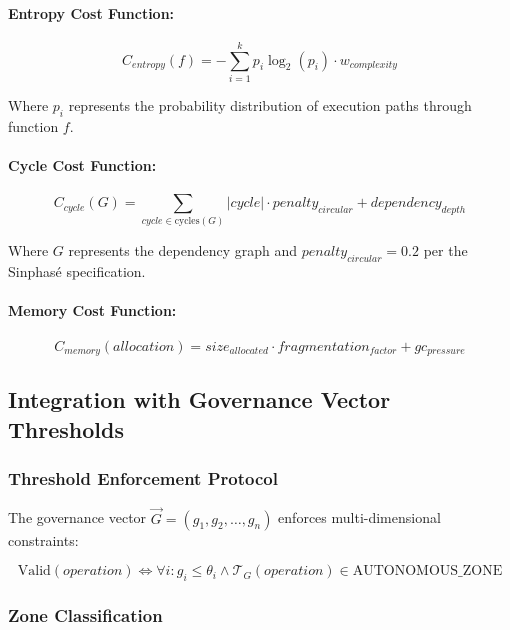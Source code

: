 \paragraph{Entropy Cost Function:}
\begin{equation}
C_{entropy}(f) = -\sum_{i=1}^{k} p_i \log_2(p_i) \cdot w_{complexity}
\end{equation}

Where $p_i$ represents the probability distribution of execution paths through function $f$.

\paragraph{Cycle Cost Function:}
\begin{equation}
C_{cycle}(G) = \sum_{cycle \in \text{cycles}(G)} |cycle| \cdot penalty_{circular} + dependency_{depth}
\end{equation}

Where $G$ represents the dependency graph and $penalty_{circular} = 0.2$ per the Sinphasé specification.

\paragraph{Memory Cost Function:}
\begin{equation}
C_{memory}(allocation) = size_{allocated} \cdot fragmentation_{factor} + gc_{pressure}
\end{equation}

\subsection{Integration with Governance Vector Thresholds}

\subsubsection{Threshold Enforcement Protocol}

The governance vector $\vec{G} = (g_1, g_2, \ldots, g_n)$ enforces multi-dimensional constraints:

\begin{equation}
\text{Valid}(operation) \iff \forall i: g_i \leq \theta_i \land \mathcal{T}_G(operation) \in \text{AUTONOMOUS\_ZONE}
\end{equation}

\subsubsection{Zone Classification}

